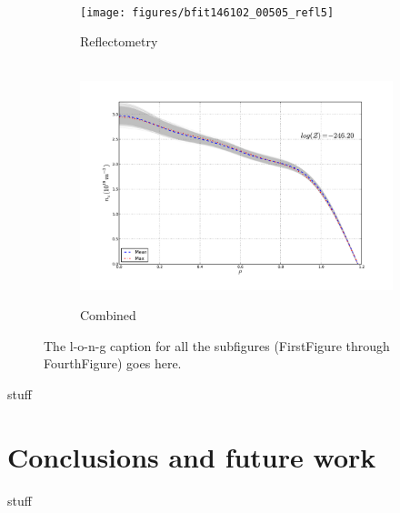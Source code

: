 \documentclass[12pt]{article}
\numberwithin{equation}{section}
\begin{document}
\begin{figure}[ht]
\begin{subfigure}[b]{0.5\textwidth}
		\label{fig:inter505}
	\end{subfigure} \\%
	\begin{subfigure}[b]{0.5\textwidth}
		\centering
		\texttt{[image: figures/bfit146102\_00505\_refl5]}
		\vspace{-30pt}
		\caption{Reflectometry}
		\label{fig:refl505}
	\end{subfigure}
	\hspace{-20pt}
	\begin{subfigure}[b]{0.5\textwidth}
		\centering‪
		\includegraphics[width=\textwidth,keepaspectratio=true]{figures/bfit146102_00505_all5}
		\vspace{-30pt}
		\caption{Combined}
		\label{fig:all505}
	\end{subfigure}
	\caption{The l-o-n-g caption for all the subfigures (FirstFigure through FourthFigure) goes here.}
	\label{fig:dne505}
\end{figure}
stuff

\section{Conclusions and future work}
stuff
\newpage


\end{document}
